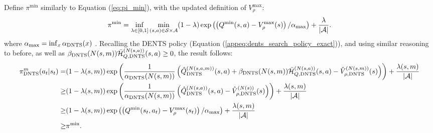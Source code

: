 \begin{proofoutline}
                Define $\pi^{\min}$ similarly to Equation (\ref{eq:pi_min}), with the updated definition of $V_\rho^{\max}$: 
                \begin{align}
                    \pi^{\min} = \inf_{\lambda\in[0,1]} \min_{(s,a)\in\mathcal{S}\times\mathcal{A}} (1-\lambda) \exp\left(\left(Q^{\min}(s,a)-V_\rho^{\max}(s)\right)/\alpha_{\max}\right) + \frac{\lambda}{|\mathcal{A}|}. \label{eq:pi_min_dents}
                \end{align}
                where $\alpha_{\max}=\inf_x {\alpha_{{\textnormal{DNTS}}}}(x)$ . Recalling the DENTS policy (Equation (\ref{appeq:dents_search_policy_exact})), and using similar reasoning to before, as well as ${\beta_{{\textnormal{DNTS}}}}(N(s,m)){\bar{\mathcal{H}}^{(N(s,a))}_{Q,{\textnormal{DNTS}}}}(s,a) \geq 0$, the result follows:
                \begin{align}
                    {\pi^{m}_{{\textnormal{DNTS}}}}(a_t|s_t) 
                        =& (1-\lambda(s,m))\exp\left(\frac{1}{{\alpha_{{\textnormal{DNTS}}}}(N(s,m))}
                            \left({\hat{Q}^{(N(s,a,m))}_{{\textnormal{DNTS}}}}(s,a) 
                            + {\beta_{{\textnormal{DNTS}}}}(N(s,m)){\bar{\mathcal{H}}^{(N(s,a))}_{Q,{\textnormal{DNTS}}}}(s,a) 
                            - {\hat{V}^{(N(s,m))}_{\rho,{\textnormal{DNTS}}}}(s) \right)\right) 
                            + \frac{\lambda(s,m)}{|\mathcal{A}|} \\
                        \geq& (1-\lambda(s,m))\exp\left(\frac{1}{{\alpha_{{\textnormal{DNTS}}}}(N(s,m))}
                            \left({\hat{Q}^{(N(s,a))}_{{\textnormal{DNTS}}}}(s,a) - {\hat{V}^{(N(s))}_{\rho,{\textnormal{DNTS}}}}(s) \right)\right) 
                            + \frac{\lambda(s,m)}{|\mathcal{A}|} \\
                        \geq& (1-\lambda(s,m))\exp\left(\left(Q^{\min}(s_t,a_t)-V_\rho^{\max}(s_t)\right)/\alpha_{\max}\right) 
                            + \frac{\lambda(s,m)}{|\mathcal{A}|} \\
                        \geq& \pi^{\min}.
                \end{align}
            \end{proofoutline}








